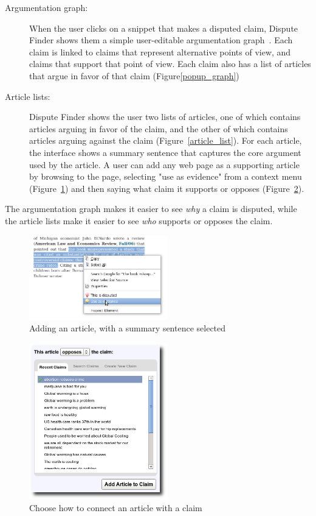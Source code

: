 \documentclass{www2010-submission}
\begin{document}
\begin{description}
\item[Argumentation graph:] When the user clicks on a snippet that makes a disputed claim, Dispute Finder shows them a simple user-editable argumentation graph~\cite{Conklin1987a}. Each claim is linked to claims that represent alternative points of view, and claims that support that point of view. Each claim also has a list of articles that argue in favor of that claim (Figure\ref{popup_graph})

\item[Article lists:] Dispute Finder shows the user two lists of articles, one of which contains articles arguing in favor of the claim, and the other of which contains articles arguing against the claim (Figure~\ref{article_list}). For each article, the interface shows a summary sentence that captures the core argument used by the article. A user can add any web page as a supporting article by browsing to the page, selecting "use as evidence" from a context menu (Figure~\ref{add_article}) and then saying what claim it supports or opposes (Figure~\ref{article_choose}).
\end{description}

The argumentation graph makes it easier to see {\it why} a claim is disputed, while the article lists make it easier to see {\it who} supports or opposes the claim. 

\begin{figure}[tb]
	\begin{center}
	\includegraphics[width=6cm]{pictures/mark_evidence.png}
	\caption{Adding an article, with a summary sentence selected}
	\label{add_article}
	\end{center}
\end{figure}

\begin{figure}[tb]
	\begin{center}
	\includegraphics[width=6cm]{pictures/article_choose_claim.png}
	\caption{Choose how to connect an article with a claim}
	\label{article_choose}
	\end{center}
\end{figure}
\end{document}
